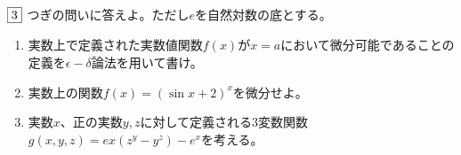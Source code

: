 \begin{tcolorbox} %
	$\fbox{3}$ つぎの問いに答えよ。ただし$e$を自然対数の底とする。
\begin{enumerate}
	\item 実数上で定義された実数値関数$f(x)$が$x= a$において微分可能であることの定義を$\epsilon- \delta$論法を用いて書け。
	\item 実数上の関数$f(x)= (\sin{x}+ 2)^x$を微分せよ。
	\item 実数$x$、正の実数$y, z$に対して定義される3変数関数$g(x, y, z)= ex(z^y- y^z)- e^x$を考える。
\end{enumerate}
\end{tcolorbox}

